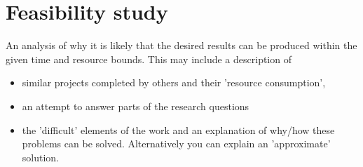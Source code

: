 \documentclass[informationsecurity]{gucmasterproject}
\begin{document}
%
%
%
%
\chapter{Feasibility study}
An analysis of why it is likely that the desired
results can be produced within the given time and
resource bounds.  This may include a description of
\begin{itemize}
\item similar projects completed by others and their 'resource consumption',
\item an attempt to answer parts of the research questions
\item the 'difficult' elements of the work and an explanation of why/how these problems can be solved.  
Alternatively you can explain an 'approximate' solution.
\end{itemize}
\end{document}
